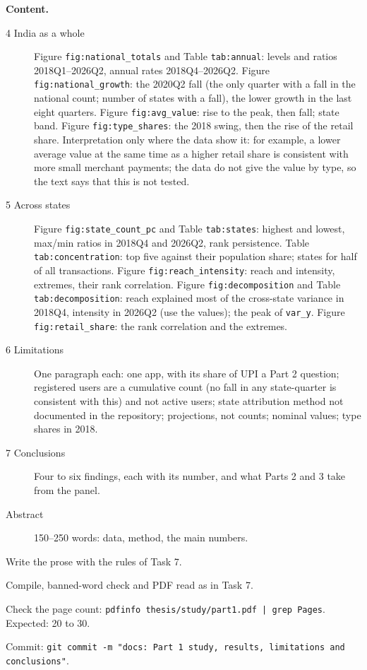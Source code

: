 \documentclass[10pt,a4paper]{article}
\newcommand{\f}[1]{\texttt{#1}}
\begin{document}
\textbf{Content.}
\begin{description}
\item[4 India as a whole] Figure \f{fig:national\_totals} and Table \f{tab:annual}: levels and ratios
  2018Q1--2026Q2, annual rates 2018Q4--2026Q2. Figure \f{fig:national\_growth}: the 2020Q2 fall (the only quarter
  with a fall in the national count; number of states with a fall), the lower growth in the last eight quarters.
  Figure \f{fig:avg\_value}: rise to the peak, then fall; state band. Figure \f{fig:type\_shares}: the 2018 swing,
  then the rise of the retail share. Interpretation only where the data show it: for example, a lower average
  value at the same time as a higher retail share is consistent with more small merchant payments; the data do
  not give the value by type, so the text says that this is not tested.
\item[5 Across states] Figure \f{fig:state\_count\_pc} and Table \f{tab:states}: highest and lowest, max/min
  ratios in 2018Q4 and 2026Q2, rank persistence. Table \f{tab:concentration}: top five against their population
  share; states for half of all transactions. Figure \f{fig:reach\_intensity}: reach and intensity, extremes,
  their rank correlation. Figure \f{fig:decomposition} and Table \f{tab:decomposition}: reach explained most of
  the cross-state variance in 2018Q4, intensity in 2026Q2 (use the values); the peak of \f{var\_y}. Figure
  \f{fig:retail\_share}: the rank correlation and the extremes.
\item[6 Limitations] One paragraph each: one app, with its share of UPI a Part 2 question; registered users are a
  cumulative count (no fall in any state-quarter is consistent with this) and not active users; state attribution
  method not documented in the repository; projections, not counts; nominal values; type shares in 2018.
\item[7 Conclusions] Four to six findings, each with its number, and what Parts 2 and 3 take from the panel.
\item[Abstract] 150--250 words: data, method, the main numbers.
\end{description}

\begin{steps}
\item Write the prose with the rules of Task 7.
\item Compile, banned-word check and PDF read as in Task 7.
\item Check the page count: \f{pdfinfo thesis/study/part1.pdf | grep Pages}. Expected: 20 to 30.
\item Commit: \f{git commit -m "docs: Part 1 study, results, limitations and conclusions"}.
\end{steps}
\end{document}
